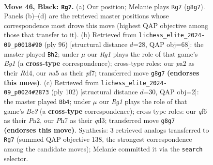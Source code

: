\documentclass[11pt]{article}
\begin{document}
\clearpage

\begin{figure}[p]\centering
\begin{subfigure}{0.46\textwidth}\centering
\resizebox{\linewidth}{!}{%
\newchessgame
\chessboard[
  setfen={6rk/7p/5Q1P/Np6/6P1/8/PP5K/3R4 b - - 2 46},
  showmover=false,
  pgfstyle=straightmove, color=movearrow, markmove={g8-g7}
]}
\caption{}
\end{subfigure}\hfill
\begin{subfigure}{0.46\textwidth}\centering
\resizebox{\linewidth}{!}{%
\newchessgame
\chessboard[
  setfen={8/5pP1/k4P2/5p2/p1pR3P/7q/1P6/6BK w - - 11 49},
  showmover=false,
  pgfstyle=straightmove, color=movearrow, markmove={g1-h2}
]}
\caption{}
\end{subfigure}
\\[4pt]
\begin{subfigure}{0.46\textwidth}\centering
\resizebox{\linewidth}{!}{%
\newchessgame
\chessboard[
  setfen={8/8/1pk3p1/4R1P1/7p/2Bq3P/PK2p3/8 w - - 12 52},
  showmover=false,
  pgfstyle=straightmove, color=movearrow, markmove={c3-b4}
]}
\caption{}
\end{subfigure}\hfill

\caption{\textbf{Move 46, Black: \texttt{Rg7}.} (a) Our position; Melanie plays \texttt{Rg7} (\texttt{g8g7}). Panels (b)--(d) are the retrieved master positions whose correspondence most drove this move (highest QAP objective among those that transfer to it). (b) Retrieved from \texttt{lichess\_elite\_2024-09\_p0018\#90} (ply 96) [structural distance $d$=28, QAP obj=68]: the master played \texttt{Bh2}; under $\mu$ our \emph{Rg1} plays the role of that game's \emph{Bg1} (a \textbf{cross-type} correspondence); cross-type roles: our \emph{p}a2 as their \emph{R}d4, our \emph{n}a5 as their \emph{p}f7; transferred move \texttt{g8g7} \textbf{(endorses this move)}. (c) Retrieved from \texttt{lichess\_elite\_2024-09\_p0024\#2873} (ply 102) [structural distance $d$=30, QAP obj=2]: the master played \texttt{Bb4}; under $\mu$ our \emph{Rg1} plays the role of that game's \emph{Bc3} (a \textbf{cross-type} correspondence); cross-type roles: our \emph{q}f6 as their \emph{P}a2, our \emph{P}h7 as their \emph{q}d3; transferred move \texttt{g8g7} \textbf{(endorses this move)}. Synthesis: 3 retrieved analogs transferred to \texttt{Rg7} (summed QAP objective 138, the strongest correspondence among the candidate moves); Melanie committed it via the \texttt{search} selector.}
\label{fig:thought-m91}
\end{figure}
\end{document}
